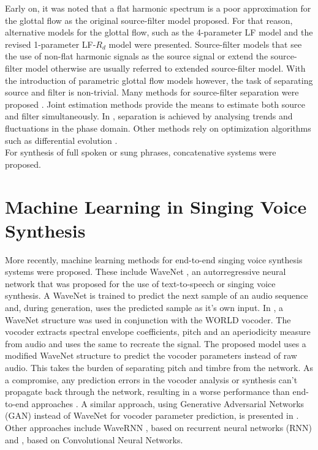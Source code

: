 Early on, it was noted that a flat harmonic spectrum is a poor approximation for the glottal flow as the original source-filter model proposed. For that reason, alternative models for the glottal flow, such as the 4-parameter LF model \cite{fant_four-parameter_1985} and the revised 1-parameter LF-$R_d$ model \cite{fant_lf-model_1995} were presented. Source-filter models that see the use of non-flat harmonic signals as the source signal or extend the source-filter model otherwise are usually referred to extended source-filter model. With the introduction of parametric glottal flow models however, the task of separating source and filter is non-trivial. Many methods for source-filter separation were proposed \cite{jinachitra_joint_2005}\cite{degottex_glottal_2010}\cite{perrotin_spectral_2019}. Joint estimation methods provide the means to estimate both source and filter simultaneously. In \cite{loweimi_source-filter_2015}, separation is achieved by analysing trends and fluctuations in the phase domain. Other methods rely on optimization algorithms such as differential evolution \cite{schleusing_joint_2013}.\\

For synthesis of full spoken or sung phrases, concatenative systems \cite{schwarz_concatenative_2006} were proposed. 

\section{Machine Learning in Singing Voice Synthesis}

More recently, machine learning methods for end-to-end singing voice synthesis systems were proposed. These include WaveNet \cite{oord_wavenet:_2016}, an autorregressive neural network that was proposed for the use of text-to-speech or singing voice synthesis. A WaveNet is trained to predict the next sample of an audio sequence and, during generation, uses the predicted sample as it's own input. In \cite{blaauw_neural_2017}, a WaveNet structure was used in conjunction with the WORLD vocoder\cite{morise_world:_2016}. The vocoder extracts spectral envelope coefficients, pitch and an aperiodicity measure from audio and uses the same to recreate the signal. The proposed model uses a modified WaveNet structure to predict the vocoder parameters instead of raw audio. This takes the burden of separating pitch and timbre from the network. As a compromise, any prediction errors in the vocoder analysis or synthesis can't propagate back through the network, resulting in a worse performance than end-to-end approaches \cite{engel_ddsp:_2020}. A similar approach, using Generative Adversarial Networks (GAN) instead of WaveNet for vocoder parameter prediction, is presented in \cite{chandna_wgansing:_2019}. Other approaches include WaveRNN \cite{kalchbrenner_efficient_2018}, based on recurrent neural networks (RNN) and \cite{nakamura_singing_2019}, based on Convolutional Neural Networks.\\

